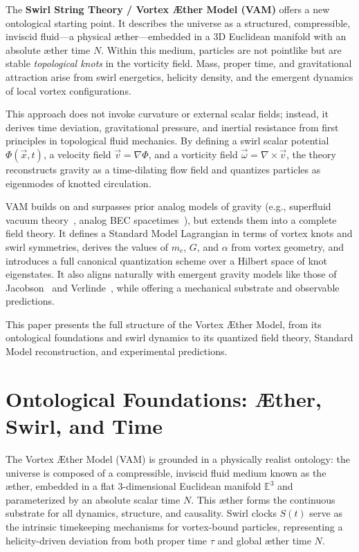 \documentclass[preprint]{revtex4-2}
\begin{document}
    The \textbf{Swirl String Theory / Vortex \AE ther Model (VAM)} offers a new ontological starting point. It describes the universe as a structured, compressible, inviscid fluid---a physical \ae ther---embedded in a 3D Euclidean manifold with an absolute æther time $N$. Within this medium, particles are not pointlike but are stable \textit{topological knots} in the vorticity field. Mass, proper time, and gravitational attraction arise from swirl energetics, helicity density, and the emergent dynamics of local vortex configurations.

    This approach does not invoke curvature or external scalar fields; instead, it derives time deviation, gravitational pressure, and inertial resistance from first principles in topological fluid mechanics. By defining a swirl scalar potential $\Phi(\vec{x},t)$, a velocity field $\vec{v} = \nabla \Phi$, and a vorticity field $\vec{\omega} = \nabla \times \vec{v}$, the theory reconstructs gravity as a time-dilating flow field and quantizes particles as eigenmodes of knotted circulation.

    VAM builds on and surpasses prior analog models of gravity (e.g., superfluid vacuum theory~\cite{barcelo2011analogue}, analog BEC spacetimes~\cite{volovik2003universe}), but extends them into a complete field theory. It defines a Standard Model Lagrangian in terms of vortex knots and swirl symmetries, derives the values of $m_e$, $G$, and $\alpha$ from vortex geometry, and introduces a full canonical quantization scheme over a Hilbert space of knot eigenstates. It also aligns naturally with emergent gravity models like those of Jacobson~\cite{jacobson1995thermo} and Verlinde~\cite{verlinde2011emergent}, while offering a mechanical substrate and observable predictions.

    This paper presents the full structure of the Vortex \AE ther Model, from its ontological foundations and swirl dynamics to its quantized field theory, Standard Model reconstruction, and experimental predictions.

\section{Ontological Foundations: Æther, Swirl, and Time}\label{sec:ontological-foundations:-ther-swirl-and-time}
    The Vortex \AE ther Model (VAM) is grounded in a physically realist ontology: the universe is composed of a compressible, inviscid fluid medium known as the \ae ther, embedded in a flat 3-dimensional Euclidean manifold $\mathbb{E}^3$ and parameterized by an absolute scalar time $N$. This æther forms the continuous substrate for all dynamics, structure, and causality. Swirl clocks $S(t)$ serve as the intrinsic timekeeping mechanisms for vortex-bound particles, representing a helicity-driven deviation from both proper time $\tau$ and global æther time $N$.
\end{document}
